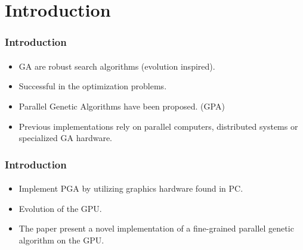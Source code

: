 \section{Introduction}
\frame
{
\frametitle{Introduction}
\framesubtitle{}
\begin{itemize}
	\item GA are robust search algorithms (evolution inspired).
	\item Successful in the optimization problems.
	\item Parallel Genetic Algorithms have been proposed. (GPA)
	\item Previous implementations rely on parallel computers, distributed systems or specialized GA hardware.
\end{itemize}
}

\frame
{
\frametitle{Introduction}
\framesubtitle{}
\begin{itemize}
	\item Implement PGA by utilizing graphics hardware found in PC.
	\item Evolution of the GPU.
	\item The paper present a novel implementation of a fine-grained parallel genetic algorithm on the GPU.
\end{itemize}
}
